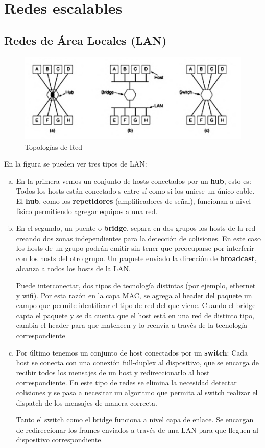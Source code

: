 \section{Redes escalables}
\subsection{Redes de Área Locales (LAN)}
\begin{figure}[H]
	\centering
	\includegraphics[width=\textwidth
]{images/topologias-red.png}
	\caption[Topologías de Red]{Topologías de Red}
	\label{fig:topologias-red}
\end{figure}
En la figura \label{fig:topologias-red} se pueden ver tres tipos de LAN:
\begin{enumerate}[a)]
  \item En la primera vemos un conjunto de hosts conectados por un \textbf{hub}, esto es: Todos los hosts están conectado
  s entre sí como si los uniese un único cable. El \textbf{hub}, como los \textbf{repetidores} (amplificadores de señal), funcionan a nivel físico permitiendo agregar equipos a una red.
  \item En el segundo, un puente o \textbf{bridge}, separa en dos grupos los hosts de la red creando dos zonas independientes para la detección de colisiones. En este caso los hosts de un grupo podrán emitir sin tener que preocuparse por interferir con los hosts del otro grupo. Un paquete enviado la dirección de \textbf{broadcast}, alcanza a todos los hosts de la LAN.
  
  Puede interconectar, dos tipos de tecnología distintas (por ejemplo, ethernet y wifi). Por esta razón en la capa MAC, se agrega al header del paquete un campo que permite identificar el tipo de red del que viene. Cuando el bridge capta el paquete y se da cuenta que el host está en una red de distinto tipo, cambia el header para que matcheen y lo reenvía a través de la tecnología correspondiente
  \item Por último tenemos un conjunto de host conectados por un \textbf{switch}: Cada host se conecta con una conexión full-duplex al dispositivo, que se encarga de recibir todos los mensajes de un host y redireccionarlo al host correspondiente. En este tipo de redes se elimina la necesidad detectar colisiones y se pasa a necesitar un algoritmo que permita al switch realizar el dispatch de los mensajes de manera correcta.
  
  Tanto el switch como el bridge funciona a nivel capa de enlace. Se encargan de redireccionar los frames enviados a través de una LAN para que lleguen al dispositivo correspondiente.
\end{enumerate}

